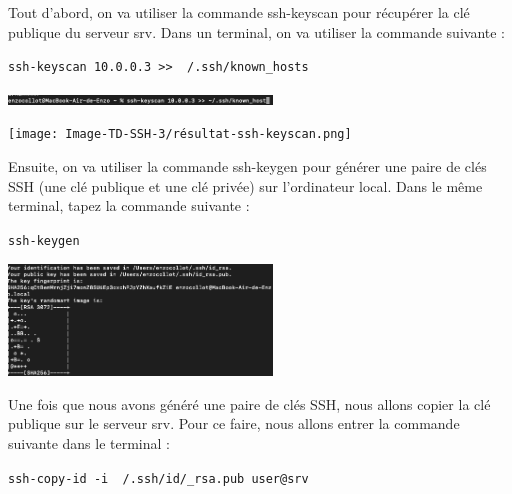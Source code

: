 \documentclass[12pt]{article}
\begin{document}
\vspace{0.3cm}

Tout d'abord, on va utiliser la commande ssh-keyscan pour récupérer la clé publique du serveur srv. Dans un terminal, on va utiliser la commande suivante : 

\texttt{ssh-keyscan 10.0.0.3 >> ~/.ssh/known\_hosts}

\vspace{0.3cm}

\begin{center}
  \includegraphics[width=7cm]{Image-TD-SSH-3/ssh-keyscan.png}
\end{center}

\vspace{0.3cm}

\begin{center}
  \texttt{[image: Image-TD-SSH-3/résultat-ssh-keyscan.png]}
\end{center}

\vspace{0.3cm}

\newpage

Ensuite, on va utiliser la commande ssh-keygen pour générer une paire de clés SSH (une clé publique et une clé privée) sur l'ordinateur local. Dans le même terminal, tapez la commande suivante :

\texttt{ssh-keygen}

\vspace{0.3cm}

\begin{center}
  \includegraphics[width=7cm]{Image-TD-SSH-3/Génération-key.png}
\end{center}


\vspace{0.3cm}

Une fois que nous avons généré une paire de clés SSH, nous allons  copier la clé publique sur le serveur srv. Pour ce faire, nous allons entrer la commande suivante dans le terminal :

\texttt{ssh-copy-id -i ~/.ssh/id/\_rsa.pub user@srv} 
\end{document}
